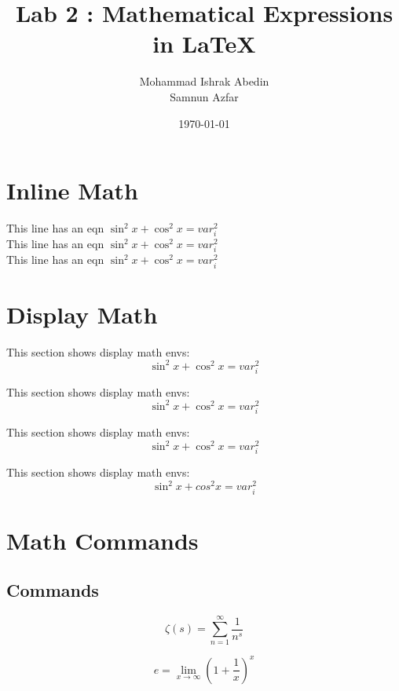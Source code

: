 \documentclass[a4paper,12pt]{article}
\title{Lab 2 : Mathematical Expressions in \LaTeX}
\author{Mohammad Ishrak Abedin \\ Samnun Azfar}
\date{\today}
\begin{document}
\begin{titlepage}  
\maketitle
\end{titlepage}

\section{Inline Math}

This line has an eqn \( \sin^{2}x + \cos^{2}x = var_{i}^2 \) \\
This line has an eqn $ \sin^{2}x + \cos^{2}x = var_{i}^2 $ \\
This line has an eqn 
\begin{math}
\sin^{2}x + \cos^{2}x = var_{i}^2 
\end{math}


\section{Display Math}
This section shows display math envs:
\begin{displaymath}
    \sin^{2}x + \cos^{2}x = var_{i}^2
\end{displaymath}

This section shows display math envs:
$$    \sin^{2}x + \cos^{2}x = var_{i}^2 $$

This section shows display math envs:
\[    \sin^{2}x + \cos^{2}x = var_{i}^2 \]

This section shows display math envs:
\begin{equation}
    \sin^{2}x + cos^{2}x = var_{i}^2
\end{equation}

\section{Math Commands}


\subsection{Commands}
\begin{equation}
    \zeta(s)=\sum_{n=1}^{\infty}\frac{1}{n^s}
\end{equation}

\begin{equation}
    e = \lim_{x\to\infty} (1 + \frac{1}{x})^x
\end{equation}
\end{document}
